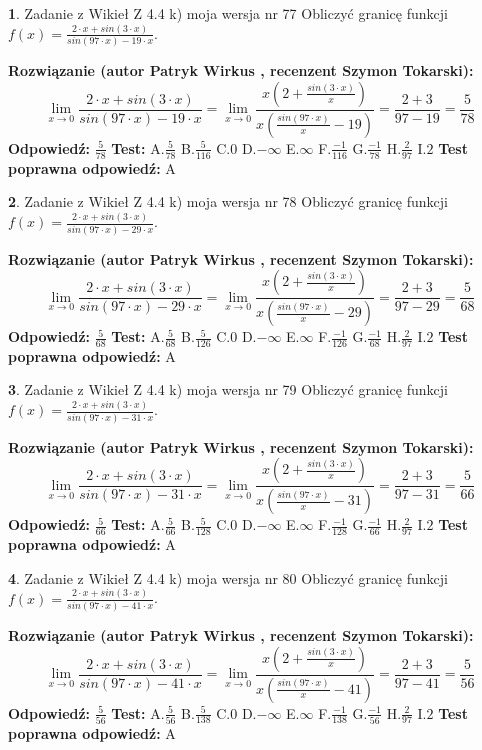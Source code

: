 \documentclass[12pt, a4paper]{article}
\theoremstyle{definition} %
\newtheorem{zad}{}
\newcommand{\zadStart}[1]{\begin{zad}#1\newline}
\newcommand{\zadStop}{\end{zad}}
\newcommand{\rozwStart}[2]{\noindent \textbf{Rozwiązanie (autor #1 , recenzent #2): }\newline}
\newcommand{\rozwStop}{\newline}
\newcommand{\odpStart}{\noindent \textbf{Odpowiedź:}\newline}
\newcommand{\odpStop}{\newline}
\newcommand{\testStart}{\noindent \textbf{Test:}\newline}
\newcommand{\testStop}{\newline}
\newcommand{\kluczStart}{\noindent \textbf{Test poprawna odpowiedź:}\newline}
\newcommand{\kluczStop}{\newline}
\begin{document}
\zadStart{Zadanie z Wikieł Z 4.4 k) moja wersja nr 77}
Obliczyć granicę funkcji $f(x)=\frac{2\cdot x +sin(3\cdot x)}{sin(97\cdot x) -19\cdot x}$.
\zadStop
\rozwStart{Patryk Wirkus}{Szymon Tokarski}
$$\lim\limits_{x\to 0}\frac{2\cdot x +sin(3\cdot x)}{sin(97\cdot x) -19\cdot x}
=\lim\limits_{x\to 0}\frac{x(2+\frac{sin(3\cdot x)}{x})}{x(\frac{sin(97\cdot x)}{x}-19)}
=\frac{2+3}{97-19} = \frac{5}{78}$$
\rozwStop
\odpStart
$\frac{5}{78}$
\odpStop
\testStart
A.$\frac{5}{78}$
B.$\frac{5}{116}$
C.$0$
D.$-\infty$
E.$\infty$
F.$\frac{-1}{116}$
G.$\frac{-1}{78}$
H.$\frac{2}{97}$
I.$2$
\testStop
\kluczStart
A
\kluczStop



\zadStart{Zadanie z Wikieł Z 4.4 k) moja wersja nr 78}
Obliczyć granicę funkcji $f(x)=\frac{2\cdot x +sin(3\cdot x)}{sin(97\cdot x) -29\cdot x}$.
\zadStop
\rozwStart{Patryk Wirkus}{Szymon Tokarski}
$$\lim\limits_{x\to 0}\frac{2\cdot x +sin(3\cdot x)}{sin(97\cdot x) -29\cdot x}
=\lim\limits_{x\to 0}\frac{x(2+\frac{sin(3\cdot x)}{x})}{x(\frac{sin(97\cdot x)}{x}-29)}
=\frac{2+3}{97-29} = \frac{5}{68}$$
\rozwStop
\odpStart
$\frac{5}{68}$
\odpStop
\testStart
A.$\frac{5}{68}$
B.$\frac{5}{126}$
C.$0$
D.$-\infty$
E.$\infty$
F.$\frac{-1}{126}$
G.$\frac{-1}{68}$
H.$\frac{2}{97}$
I.$2$
\testStop
\kluczStart
A
\kluczStop



\zadStart{Zadanie z Wikieł Z 4.4 k) moja wersja nr 79}
Obliczyć granicę funkcji $f(x)=\frac{2\cdot x +sin(3\cdot x)}{sin(97\cdot x) -31\cdot x}$.
\zadStop
\rozwStart{Patryk Wirkus}{Szymon Tokarski}
$$\lim\limits_{x\to 0}\frac{2\cdot x +sin(3\cdot x)}{sin(97\cdot x) -31\cdot x}
=\lim\limits_{x\to 0}\frac{x(2+\frac{sin(3\cdot x)}{x})}{x(\frac{sin(97\cdot x)}{x}-31)}
=\frac{2+3}{97-31} = \frac{5}{66}$$
\rozwStop
\odpStart
$\frac{5}{66}$
\odpStop
\testStart
A.$\frac{5}{66}$
B.$\frac{5}{128}$
C.$0$
D.$-\infty$
E.$\infty$
F.$\frac{-1}{128}$
G.$\frac{-1}{66}$
H.$\frac{2}{97}$
I.$2$
\testStop
\kluczStart
A
\kluczStop



\zadStart{Zadanie z Wikieł Z 4.4 k) moja wersja nr 80}
Obliczyć granicę funkcji $f(x)=\frac{2\cdot x +sin(3\cdot x)}{sin(97\cdot x) -41\cdot x}$.
\zadStop
\rozwStart{Patryk Wirkus}{Szymon Tokarski}
$$\lim\limits_{x\to 0}\frac{2\cdot x +sin(3\cdot x)}{sin(97\cdot x) -41\cdot x}
=\lim\limits_{x\to 0}\frac{x(2+\frac{sin(3\cdot x)}{x})}{x(\frac{sin(97\cdot x)}{x}-41)}
=\frac{2+3}{97-41} = \frac{5}{56}$$
\rozwStop
\odpStart
$\frac{5}{56}$
\odpStop
\testStart
A.$\frac{5}{56}$
B.$\frac{5}{138}$
C.$0$
D.$-\infty$
E.$\infty$
F.$\frac{-1}{138}$
G.$\frac{-1}{56}$
H.$\frac{2}{97}$
I.$2$
\testStop
\kluczStart
A
\kluczStop
\end{document}
